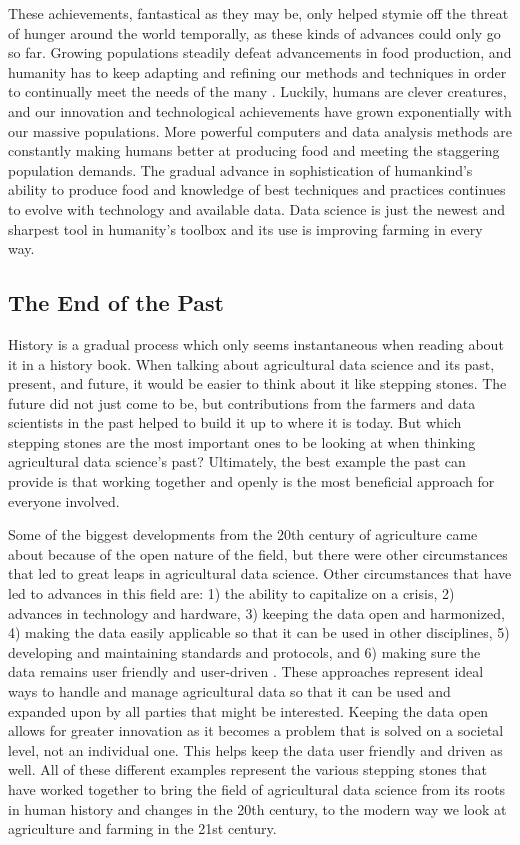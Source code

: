 \documentclass[sigconf]{acmart}
\begin{document}
These achievements, fantastical as they may be, only helped stymie off the threat of hunger around the world temporally, as these kinds of advances could only go so far. Growing populations steadily defeat advancements in food production, and humanity has to keep adapting and refining our methods and techniques in order to continually meet the needs of the many \cite{mendelsohn1999}. Luckily, humans are clever creatures, and our innovation and technological achievements have grown exponentially with our massive populations. More powerful computers and data analysis methods are constantly making humans better at producing food and meeting the staggering population demands. The gradual advance in sophistication of humankind's ability to produce food and knowledge of best techniques and practices continues to evolve with technology and available data. Data science is just the newest and sharpest tool in humanity's toolbox and its use is improving farming in every way.


\subsection{The End of the Past}

History is a gradual process which only seems instantaneous when reading about it in a history book. When talking about agricultural data science and its past, present, and future, it would be easier to think about it like stepping stones. The future did not just come to be, but contributions from the farmers and data scientists in the past helped to build it up to where it is today. But which stepping stones are the most important ones to be looking at when thinking agricultural data science's past? Ultimately, the best example the past can provide is that working together and openly is the most beneficial approach for everyone involved.

Some of the biggest developments from the 20th century of agriculture came about because of the open nature of the field, but there were other circumstances that led to great leaps in agricultural data science. Other circumstances that have led to advances in this field are: 1) the ability to capitalize on a crisis, 2) advances in technology and hardware, 3) keeping the data open and harmonized, 4) making the data easily applicable so that it can be used in other disciplines, 5) developing and maintaining standards and protocols, and 6) making sure the data remains user friendly and user-driven \cite{jones2017}. These approaches represent ideal ways to handle and manage agricultural data so that it can be used and expanded upon by all parties that might be interested. Keeping the data open allows for greater innovation as it becomes a problem that is solved on a societal level, not an individual one. This helps keep the data user friendly and driven as well. All of these different examples represent the various stepping stones that have worked together to bring the field of agricultural data science from its roots in human history and changes in the 20th century, to the modern way we look at agriculture and farming in the 21st century.
\end{document}
